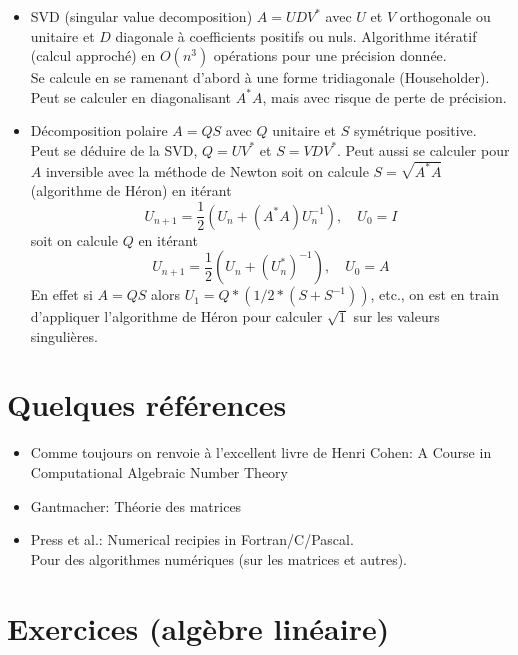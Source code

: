 \documentclass[a4paper,11pt]{book}
\begin{document}
\begin{giacjshere}
\begin{itemize}
\item SVD (singular value decomposition) $A=UDV^*$ avec
$U$ et $V$ orthogonale ou unitaire et $D$ diagonale \`a coefficients
positifs ou nuls. Algorithme it\'eratif (calcul approch\'e) en $O(n^3)$
op\'erations pour une pr\'ecision donn\'ee.\\
Se calcule en se ramenant d'abord \`a une forme tridiagonale (Householder).\\
Peut se calculer en diagonalisant $A^* A$, mais avec risque
de perte de pr\'ecision.
\item D\'ecomposition polaire $A=QS$ avec $Q$ unitaire et $S$ sym\'etrique
positive. \\
Peut se d\'eduire de la SVD, $Q=UV^*$ et $S=VDV^*$.
Peut aussi se calculer pour $A$ inversible avec la m\'ethode de Newton
soit on calcule $S=\sqrt{A^* A}$ (algorithme de H\'eron) en it\'erant
$$ U_{n+1}=\frac{1}{2}(U_n+(A^*A)U_n^{-1}), \quad U_0=I$$
soit on calcule $Q$ en it\'erant
$$ U_{n+1}=\frac{1}{2}(U_n+(U_n^*)^{-1}), \quad U_0=A$$
En effet si $A=QS$ alors $U_1=Q*(1/2*(S+S^{-1}))$, etc., on 
est en train d'appliquer
l'algorithme de H\'eron pour calculer $\sqrt{1}$ sur les
valeurs singuli\`eres.
\end{itemize}

\section{Quelques r\'ef\'erences} \label{sec:ref}

\begin{itemize}
\item Comme toujours on renvoie à l'excellent livre de Henri Cohen:
A Course in Computational Algebraic Number Theory

\item Gantmacher: Th\'eorie des matrices


\item Press et al.: Numerical recipies in Fortran/C/Pascal.\\
Pour des algorithmes numériques (sur les matrices et autres).

\end{itemize}


\section{Exercices (alg\`ebre lin\'eaire)}

\end{giacjshere}
\end{document}
